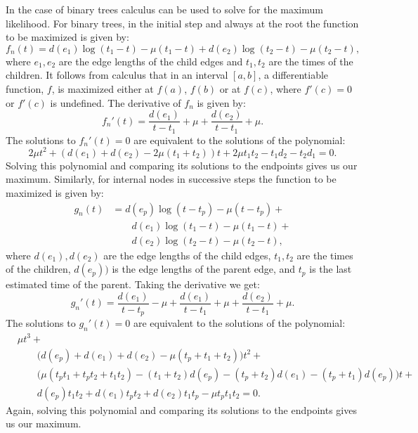 \documentclass[12pt]{article}
\begin{document}
		In the case of binary trees calculus can be used to solve for the maximum likelihood.
		For binary trees, in the initial step and always at the root the function to be maximized is given by:
		\[f_n(t) = d(e_1) \log (t_1-t) - \mu (t_1 - t) + d(e_2) \log (t_2 - t) - \mu (t_2 - t),\]
		where $e_1, e_2$ are the edge lengths of the child edges and $t_1, t_2$ are the times of the children.
		It follows from calculus that in an interval $[a, b]$, a differentiable function, $f$, is maximized either at $f(a)$, $f(b)$ or at $f(c)$, where $f'(c) = 0$ or $f'(c)$ is undefined.
		The derivative of $f_n$ is given by:
		\[f_n'(t) = \frac{d(e_1)}{t-t_1} + \mu + \frac{d(e_2)}{t - t_1} + \mu.\]
		The solutions to $f_n'(t) = 0$ are equivalent to the solutions of the polynomial:
		\[2\mu t^2 + (d(e_1)+d(e_2)-2\mu (t_1+t_2))t + 2\mu t_1t_2-t_1d_2-t_2d_1=0.\]
		Solving this polynomial and comparing its solutions to the endpoints gives us our maximum.
		Similarly, for internal nodes in successive steps the function to be maximized is given by:
		\begin{align*}
			g_n(t) &= d(e_p) \log (t-t_p) - \mu (t-t_p) + \\
			&\qquad d(e_1) \log (t_1-t) - \mu (t_1 - t) + \\
			&\qquad d(e_2) \log (t_2 - t) - \mu (t_2 - t),
		\end{align*}
		where $d(e_1), d(e_2)$ are the edge lengths of the child edges, $t_1, t_2$ are the times of the children, $d(e_p))$ is the edge lengths of the parent edge, and $t_p$ is the last estimated time of the parent.
		Taking the derivative we get:
		\[g_n'(t) = \frac{d(e_1)}{t-t_p} - \mu + \frac{d(e_1)}{t-t_1} + \mu + \frac{d(e_2)}{t - t_1} + \mu.\]
		The solutions to $g_n'(t) = 0$ are equivalent to the solutions of the polynomial:
		\begin{align*}
			&\mu t^3+ \\
			&\qquad \big(d(e_p) + d(e_1) + d(e_2) - \mu(t_p + t_1 + t_2)\big) t^2 + \\
			&\qquad \big(\mu (t_pt_1 + t_pt_2 + t_1t_2) - (t_1 + t_2) d(e_p) - (t_p + t_2) d(e_1) - (t_p + t_1) d(e_p)\big) t +  \\
			&\qquad d(e_p)t_1t_2 + d(e_1)t_pt_2 + d(e_2)t_1t_p - \mu t_p t_1 t_2 = 0.
		\end{align*}
		Again, solving this polynomial and comparing its solutions to the endpoints gives us our maximum.
	\printbibliography{}
\end{document}
